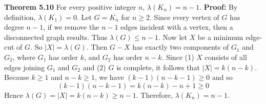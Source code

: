 \nopagenumbers
{\bf Theorem 5.10}
\vskip 6pt
For every positive integer $n$, $\lambda (K_n)=n-1$.
\vskip 10pt
{\bf Proof:}
\vskip 6pt
By definition, $\lambda (K_1)=0$. Let $G=K_n$ for $n \geq 2$. Since every vertex of $G$ has degree $n-1$, if we remove the $n-1$ edges incident with a vertex, then a disconnected graph results. Thus $ \lambda (G) \leq n-1$. Now let $X$ be a minimum edge-cut of $G$. So $|X|= \lambda (G)$. Then $G-X$ has exactly two components of $G_1$ and $G_2$, where $G_1$ has order $k$, and $G_2$ has order $n-k$. Since (1) $X$ consists of all edges joining $G_1$ and $G_2$ and (2) $G$ is complete, it follows that $|X|=k(n-k)$. Because $k \geq 1$ and $n-k \geq 1$, we have $(k-1)(n-k-1) \geq 0$ and so $$(k-1)(n-k-1)=k(n-k)-n+1 \geq 0$$ Hence $\lambda (G)=|X|=k(n-k) \geq n-1$. Therefore, $\lambda (K_n)=n-1$.

\vfill\eject
